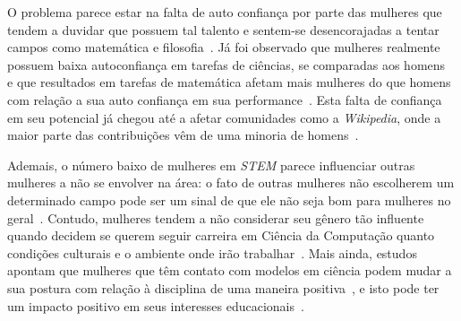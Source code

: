 O problema parece estar na falta de auto confiança por parte das mulheres que tendem a duvidar que possuem tal talento e sentem-se desencorajadas a tentar campos como matemática e filosofia~\cite{leslie2015expectations}. Já foi observado que mulheres realmente possuem baixa autoconfiança em tarefas de ciências, se comparadas aos homens~\cite{fox1992confidence} e que resultados em tarefas de matemática afetam mais mulheres do que homens com relação a sua auto confiança em sua performance~\cite{campbell1986effects}. Esta falta de confiança em seu potencial já chegou até a afetar comunidades como a \emph{Wikipedia}, onde a maior parte das contribuições vêm de uma minoria de homens~\cite{antin2011gender,lam2011wp}.

Ademais, o número baixo de mulheres em \emph{STEM} parece influenciar outras mulheres a não se envolver na área: o fato de outras mulheres não escolherem um determinado campo pode ser um sinal de que ele não seja bom para mulheres no geral~\cite{shapiro2011major}. Contudo, mulheres tendem a não considerar seu gênero tão influente quando decidem se querem seguir carreira em Ciência da Computação quanto condições culturais e o ambiente onde irão trabalhar~\cite{blum2007cultural}. Mais ainda, estudos apontam que mulheres que têm contato com modelos em ciência podem mudar a sua postura com relação à disciplina de uma maneira positiva~\cite{smith1986effect}, e isto pode ter um impacto positivo em seus interesses educacionais~\cite{nixon1999educational}.




